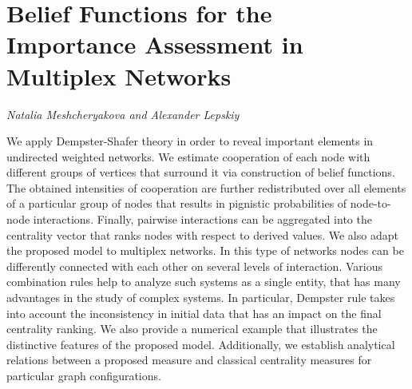 \documentclass[../booklet.tex]{subfiles}
\begin{document}
\section[Belief Functions for the Importance Assessment in Multiplex Networks. {\it Natalia Meshcheryakova and Alexander Lepskiy}]{Belief Functions for the Importance Assessment in Multiplex Networks}
 

\begin{center}
  {\it Natalia Meshcheryakova and Alexander Lepskiy}
\end{center}

\vskip 0.8cm


We apply Dempster-Shafer theory in order to reveal important elements in undirected weighted networks. We estimate cooperation of each node with different groups of vertices that surround it via construction of belief functions. The obtained intensities of cooperation are further redistributed over all elements of a particular group of nodes that results in pignistic probabilities of node-to-node interactions. Finally, pairwise interactions can be aggregated into the centrality vector that ranks nodes with respect to derived values. We also adapt the proposed model to multiplex networks. In this type of networks nodes can be differently connected with each other on several levels of interaction. Various combination rules help to analyze such systems as a single entity, that has many advantages in the study of complex systems. In particular, Dempster rule takes into account the inconsistency in initial data that has an impact on the final centrality ranking. We also provide a numerical example that illustrates the distinctive features of the proposed model. Additionally, we establish analytical relations between a proposed measure and classical centrality measures for particular graph configurations.

\end{document}
